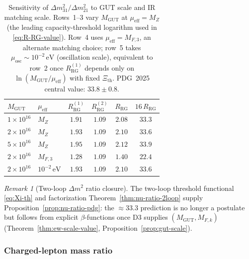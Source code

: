 \documentclass[11pt]{article}
\theoremstyle{plain}
\theoremstyle{definition}
\theoremstyle{remark}
\newtheorem{remark}[theorem]{Remark}
\numberwithin{equation}{section}
\begin{document}
\begin{table}[ht]
\centering
\small
\renewcommand{\arraystretch}{1.1}
\begin{tabular}{@{}llcccc@{}}
\toprule
$M_{\mathrm{GUT}}$ &
$\mu_{\mathrm{eff}}$ &
$R_{\mathrm{RG}}^{(1)}$ &
$R_{\mathrm{RG}}^{(2)}$ &
$R_{\mathrm{RG}}$ &
$16\,R_{\mathrm{RG}}$ \\
\midrule
$1\times 10^{16}$ & $M_Z$ & $1.91$ & $1.09$ & $2.08$ & $33.3$ \\
$2\times 10^{16}$ & $M_Z$ & $1.93$ & $1.09$ & $2.10$ & $33.6$ \\
$5\times 10^{16}$ & $M_Z$ & $1.95$ & $1.09$ & $2.12$ & $33.9$ \\
$2\times 10^{16}$ & $M_{F,3}$ & $1.28$ & $1.09$ & $1.40$ & $22.4$ \\
$2\times 10^{16}$ & $10^{-2}\,\mathrm{eV}$ & $1.93$ & $1.09$ & $2.10$ & $33.6$ \\
\bottomrule
\end{tabular}
\caption{Sensitivity of $\Delta m^2_{31}/\Delta m^2_{21}$ to GUT scale and IR
matching scale. Rows~1--3 vary $M_{\mathrm{GUT}}$ at $\mu_{\mathrm{eff}}=M_Z$
(the leading capacity-threshold logarithm used in \eqref{eq:R-RG-value}).
Row~4 uses $\mu_{\mathrm{eff}}=M_{F,3}$, an alternate matching choice;
row~5 takes $\mu_{\mathrm{osc}}\sim 10^{-2}\,\mathrm{eV}$
(oscillation scale), equivalent to row~2 once $R_{\mathrm{RG}}^{(1)}$ depends
only on $\ln(M_{\mathrm{GUT}}/\mu_{\mathrm{eff}})$ with fixed
$\Xi_{\mathrm{th}}$. PDG~2025 central value: $33.8\pm 0.8$.}
\label{tab:nu-ratio-sensitivity}
\end{table}

\begin{remark}[Two-loop $\Delta m^2$ ratio closure]
The two-loop threshold functional \eqref{eq:Xi-th} and factorization
Theorem~\ref{thm:nu-ratio-2loop} supply Proposition~\ref{prop:nu-ratio-pdg}:
the $\approx 33.3$ prediction is no longer a postulate but follows from
explicit $\beta$-functions once D3 supplies $(M_{\mathrm{GUT}},M_{F,k})$
(Theorem~\ref{thm:ew-scale-value}, Proposition~\ref{prop:gut-scale}).
\end{remark}

\subsubsection{Charged-lepton mass ratio}
\end{document}
